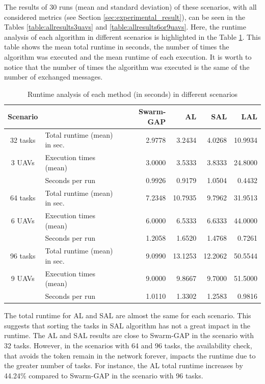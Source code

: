 The results of 30 runs (mean and standard deviation) of these scenarios, with all considered metrics (see Section \ref{sec:experimental_result}), can be seen in the Tables \ref{table:allresults3uavs} and \ref{table:allresults6or9uavs}. 
Here, the runtime analysis of each algorithm in different scenarios is highlighted in the Table \ref{table:runtime}.
This table shows the mean total runtime in seconds, 
the number of times the algorithm was executed and the mean runtime of each execution.
It is worth to notice that the number of times the algorithm was executed is the same of the number of exchanged messages.

\begin{table}[ht]
	\small
	\fontsize{8}{8}\selectfont
	\centering
	\caption{Runtime analysis of each method (in seconds) in different scenarios}
	\label{table:runtime}
	
	\begin{tabular}{clrrrr} \hline
		Scenario   &                               & Swarm-GAP &  AL     & SAL     & LAL    \\ \hline 
		32 tasks   & Total runtime (mean) in sec.  & 2.9778 & 3.2434 & 4.0268 & 10.9934 \\ 
		3 UAVs     & Execution times (mean)        & 3.0000 & 3.5333 & 3.8333 & 24.8000 \\ 
		           & Seconds per run               & 0.9926 & 0.9179 & 1.0504 & 0.4432  \\ [1ex]
		64 tasks   & Total runtime (mean) in sec.  & 7.2348 & 10.7935 & 9.7962 & 31.9513 \\ 
		6 UAVs     & Execution times (mean)        & 6.0000 & 6.5333  & 6.6333 & 44.0000 \\ 
				   & Seconds per run               & 1.2058 & 1.6520  & 1.4768 & 0.7261  \\ [1ex]
		96 tasks   & Total runtime (mean) in sec.  & 9.0990  & 13.1253 & 12.2062 & 50.5544 \\ 
		9 UAVs     & Execution times (mean)        & 9.0000  & 9.8667  & 9.7000  & 51.5000 \\ 
		           & Seconds per run               & 1.0110  & 1.3302  & 1.2583  & 0.9816  \\ [1ex] \hline 
	\end{tabular}
\end{table} 

The total runtime for AL and SAL are almost the same for each scenario. This suggests that sorting the tasks in SAL algorithm has not a great impact in the runtime. 
The AL and SAL results are close to Swarm-GAP in the scenario with 32 tasks. 
However, in the scenarios with 64 and 96 tasks, the availability check, that avoids the token remain in the network forever, impacts the runtime due to the greater number of tasks. 
For instance, the AL total runtime increases by 44.24\% compared to Swarm-GAP in the scenario with 96 tasks.

